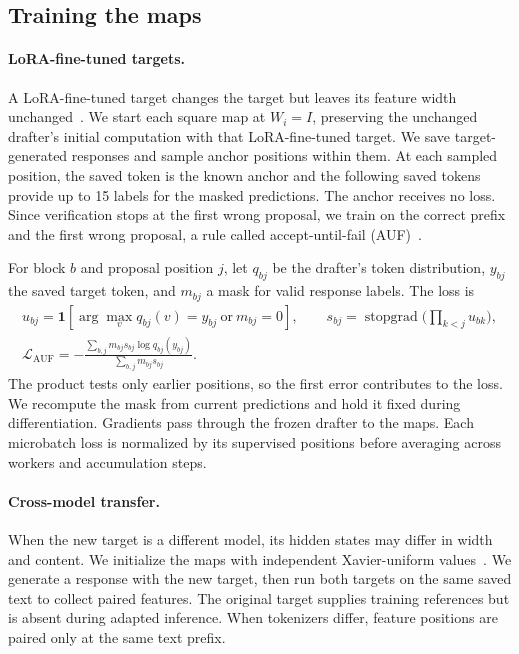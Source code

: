 \subsection{Training the maps}
\paragraph{LoRA-fine-tuned targets.}\label{sec:method-auf}
A LoRA-fine-tuned target changes the target but leaves its feature width unchanged~\citep{hu2022lora}. We start each square map at $W_i=I$, preserving the unchanged drafter's initial computation with that LoRA-fine-tuned target. We save target-generated responses and sample anchor positions within them. At each sampled position, the saved token is the known anchor and the following saved tokens provide up to 15 labels for the masked predictions. The anchor receives no loss. Since verification stops at the first wrong proposal, we train on the correct prefix and the first wrong proposal, a rule called accept-until-fail (AUF)~\citep{yang2026specauf}.

For block $b$ and proposal position $j$, let $q_{bj}$ be the drafter's token distribution, $y_{bj}$ the saved target token, and $m_{bj}$ a mask for valid response labels. The loss is
\begin{equation}
 \begin{gathered}
 u_{bj}=\mathbf 1\!\left[\arg\max_v q_{bj}(v)=y_{bj}\ \text{or}\ m_{bj}=0\right],
 \qquad s_{bj}=\operatorname{stopgrad}\bigl({\textstyle\prod_{k<j}u_{bk}}\bigr),\\
 \mathcal L_{\mathrm{AUF}}
 =-\frac{\sum_{b,j}m_{bj}s_{bj}\log q_{bj}(y_{bj})}
 {\sum_{b,j}m_{bj}s_{bj}}.
 \end{gathered}
 \label{eq:auf-method}
\end{equation}
The product tests only earlier positions, so the first error contributes to the loss. We recompute the mask from current predictions and hold it fixed during differentiation. Gradients pass through the frozen drafter to the maps. Each microbatch loss is normalized by its supervised positions before averaging across workers and accumulation steps.

\paragraph{Cross-model transfer.}\label{sec:method-mse}
When the new target is a different model, its hidden states may differ in width and content. We initialize the maps with independent Xavier-uniform values~\citep{glorot2010initialization}. We generate a response with the new target, then run both targets on the same saved text to collect paired features. The original target supplies training references but is absent during adapted inference. When tokenizers differ, feature positions are paired only at the same text prefix.

